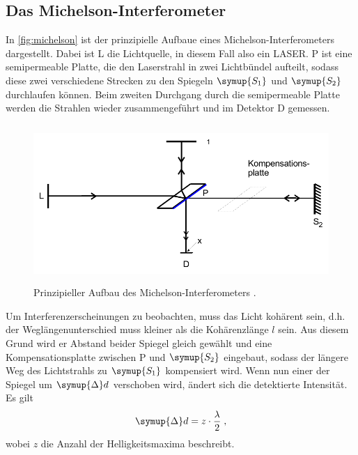 \subsection{Das Michelson-Interferometer}
In \autoref{fig:michelson} ist der prinzipielle Aufbaue eines Michelson-Interferometers dargestellt. Dabei ist L die Lichtquelle, in diesem Fall
also ein LASER. P ist eine semipermeable Platte, die den Laserstrahl in zwei Lichtbündel aufteilt, sodass diese zwei verschiedene Strecken 
zu den Spiegeln $\symup{S_1}$ und $\symup{S_2}$ durchlaufen können. Beim zweiten Durchgang durch die semipermeable Platte werden die Strahlen 
wieder zusammengeführt und im Detektor D gemessen. 
\begin{figure}
    \centering
    \includegraphics[height = 6cm]{michelson.pdf}
    \caption{Prinzipieller Aufbau des Michelson-Interferometers \cite{ap401}.}
    \label{fig:michelson}
\end{figure}
Um Interferenzerscheinungen zu beobachten, muss das Licht kohärent sein, d.h. der Weglängenunterschied muss kleiner als die Kohärenzlänge $l$ sein. 
Aus diesem Grund wird er Abstand beider Spiegel gleich gewählt und eine Kompensationsplatte zwischen P und $\symup{S_2}$ eingebaut, sodass der längere 
Weg des Lichtstrahls zu $\symup{S_1}$ kompensiert wird. Wenn nun einer der Spiegel um $\symup{\Delta}d$ verschoben wird, ändert sich die detektierte 
Intensität. Es gilt
\begin{equation}
    \symup{\Delta}d = z \cdot \frac{\lambda}{2} \; ,
    \label{eqn:Deltad}
\end{equation}
wobei $z$ die Anzahl der Helligkeitsmaxima beschreibt.


